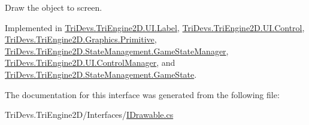 Draw the object to screen. 



Implemented in \hyperlink{class_tri_devs_1_1_tri_engine2_d_1_1_u_i_1_1_label_aaa532c9037ca1b51bab8f7eb2673438d}{Tri\-Devs.\-Tri\-Engine2\-D.\-U\-I.\-Label}, \hyperlink{class_tri_devs_1_1_tri_engine2_d_1_1_u_i_1_1_control_a9b3ac8028bcf4b7e4d128e2be6f30fed}{Tri\-Devs.\-Tri\-Engine2\-D.\-U\-I.\-Control}, \hyperlink{class_tri_devs_1_1_tri_engine2_d_1_1_graphics_1_1_primitive_a6b70bbcf294c96c757a9fc8f1ae09dd8}{Tri\-Devs.\-Tri\-Engine2\-D.\-Graphics.\-Primitive}, \hyperlink{class_tri_devs_1_1_tri_engine2_d_1_1_state_management_1_1_game_state_manager_a2d30555c64bf3337e1b6a328abde489e}{Tri\-Devs.\-Tri\-Engine2\-D.\-State\-Management.\-Game\-State\-Manager}, \hyperlink{class_tri_devs_1_1_tri_engine2_d_1_1_u_i_1_1_control_manager_a983b69c93c3d66ef1d7f324d3ea80ace}{Tri\-Devs.\-Tri\-Engine2\-D.\-U\-I.\-Control\-Manager}, and \hyperlink{class_tri_devs_1_1_tri_engine2_d_1_1_state_management_1_1_game_state_a53a4361f96b0a795f4bb20a5ae5cf954}{Tri\-Devs.\-Tri\-Engine2\-D.\-State\-Management.\-Game\-State}.



The documentation for this interface was generated from the following file\-:\begin{DoxyCompactItemize}
\item 
Tri\-Devs.\-Tri\-Engine2\-D/\-Interfaces/\hyperlink{_i_drawable_8cs}{I\-Drawable.\-cs}\end{DoxyCompactItemize}
